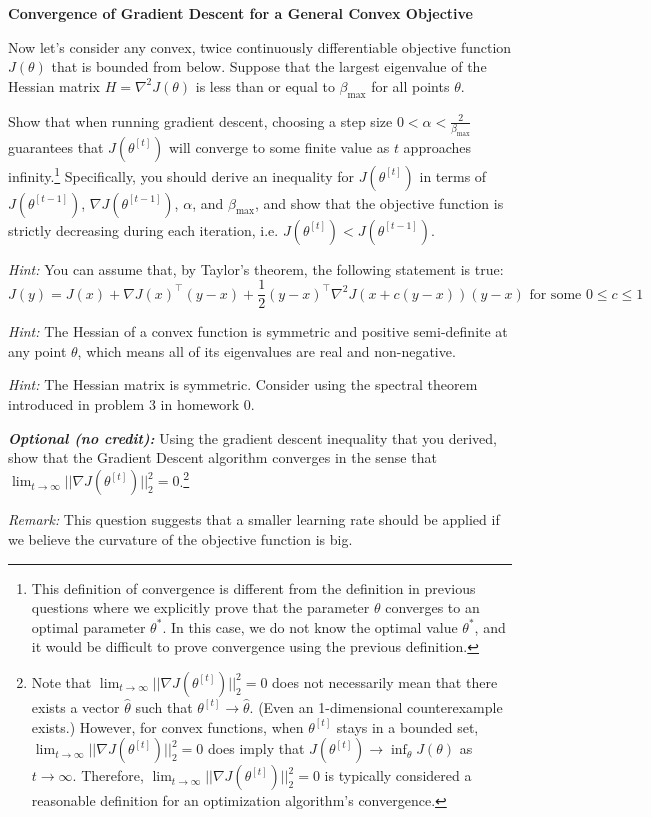\newpage
\item {} {\bf Convergence of Gradient Descent for a General Convex Objective}

Now let's consider any convex, twice continuously differentiable objective function $J(\theta)$ that is bounded from below.
Suppose that the largest eigenvalue of the Hessian matrix $H=\nabla^2 J(\theta) $ is less than or equal to $\beta_{\max}$ for all points $\theta$.


Show that when running gradient descent, choosing a step size $0 < \alpha < \frac{2}{\beta_{\max}}$ guarantees that $J(\theta^{[t]})$ will converge to some finite value as $t$ approaches infinity.\footnote{This definition of convergence is different from the definition in previous questions where we explicitly prove that the parameter $\theta$ converges to an optimal parameter $\theta^*$. In this case, we do not know the optimal value $\theta^*$, and it would be difficult to prove convergence using the previous definition.} Specifically, you should derive an inequality for $J(\theta^{[t]})$ in terms of $J(\theta^{[t-1]})$, $\nabla J(\theta^{[t-1]})$, $\alpha$, and $\beta_{\max}$, and show that the objective function is strictly decreasing during each iteration, i.e. $J(\theta^{[t]}) < J(\theta^{[t-1]})$.


\textit{Hint:} You can assume that, by Taylor's theorem, the following statement is true:
\begin{equation*}
	J(y) = J(x) + \nabla J(x)^\top (y-x) + \frac{1}{2}(y-x)^\top \nabla^2 J(x + c(y-x)) (y-x) \text{ for some } 0 \leq c \leq 1
\end{equation*}


\textit{Hint:} The Hessian of a convex function is symmetric and positive semi-definite at any point $\theta$, which means all of its eigenvalues are real and non-negative.

\textit{Hint:} The Hessian matrix is symmetric. Consider using the spectral theorem introduced in problem 3 in homework 0.

\textit{\textbf{Optional (no credit):}}  Using the gradient descent inequality that you derived, show that the Gradient Descent algorithm converges in the sense that  $\lim_{t\to\infty}||\nabla J(\theta^{[t]})||_{2}^{2}=0$.\footnote{Note that $\lim_{t\to\infty}||\nabla J(\theta^{[t]})||_{2}^{2}=0$ does not necessarily mean that there exists a vector $\hat{\theta}$ such that $\theta^{[t]} \rightarrow \hat{\theta}$. (Even an 1-dimensional counterexample exists.) However, for convex functions, when $\theta^{[t]}$ stays in a bounded set, $\lim_{t\to\infty}||\nabla J(\theta^{[t]})||_{2}^{2}=0$ does imply that $J(\theta^{[t]}) \rightarrow \inf_\theta J(\theta)$ as $t\rightarrow \infty$. Therefore, $\lim_{t\to\infty}||\nabla J(\theta^{[t]})||_{2}^{2}=0$ is typically considered a reasonable definition for an optimization algorithm's convergence.}

\textit{Remark:} This question suggests that a smaller learning rate should be applied if we believe the curvature of the objective function is big.